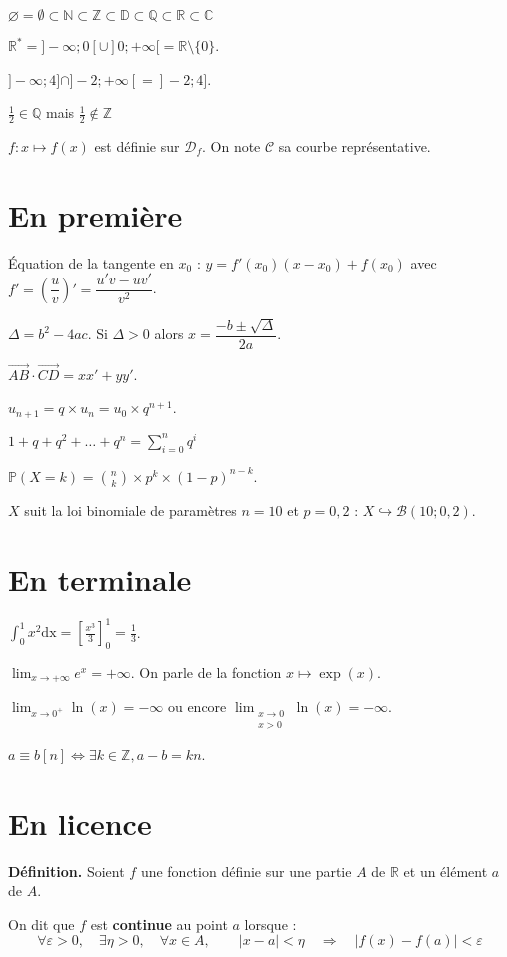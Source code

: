 \documentclass[10pt,french]{article}
\begin{document}
$\varnothing = \emptyset \subset \mathds N \subset \mathds Z \subset
\mathds D \subset \mathds Q\subset \mathds R \subset \mathds C$ \medskip

$\mathds R^*=]-\infty ; 0[ \cup ]0 ; +\infty[ = \mathds R \setminus \{0\}$.\medskip

$]-\infty ; 4] \cap ]-2 ; +\infty[ = ]-2 ; 4]$.\medskip

$\frac 1 2 \in \mathds Q$ mais $\frac 1 2 \notin \mathds Z$\medskip

$f\colon x \mapsto f(x)$ est définie sur $\mathcal D_f$.
On note $\mathcal C$ sa courbe représentative.

\section{En première}

\'Equation de la tangente en $x_0$ :
$y = f'(x_0) \left(x - x_0\right) + f(x_0)$ avec
$f' = \left(\dfrac u v\right)' = \dfrac{u'v - uv'}{v^2}$.\medskip

$\Delta = b^2 - 4ac$. Si $\Delta > 0$ alors
$x = \dfrac{-b \pm \sqrt \Delta}{2a}$.\medskip

$\overrightarrow{AB} \cdot \overrightarrow{CD} = xx' + yy'$.\medskip

$u_{n + 1} = q\times u_n = u_0 \times q^{n+1}$.\medskip

$1 + q + q^2 + \dots + q^n = \sum_{i = 0}^n q^i$\medskip

$\mathds P(X = k) = \binom n k \times p^k \times (1-p)^{n-k}$.\medskip

$X$ suit la loi binomiale de paramètres $n=10$ et $p=0,2$ :
$X \hookrightarrow \mathcal B(10 ; 0,2)$.

\section{En terminale}

$\int_0^1 x^2 \mathrm{dx} = \left[\frac{x^3}{3}\right]_0^1 = \frac 13$.\medskip

$\lim_{x \to +\infty} e^x= +\infty$. On parle de la fonction $x \mapsto \exp(x)$.\medskip

$\lim_{x \to 0^+}\ln(x) = -\infty$ ou encore $\lim_{\substack{x \to 0 \\ x > 0}}\ln(x) = -\infty$.\medskip

$a \equiv b [n] \Leftrightarrow \exists k \in \mathds Z, a - b = kn$.

\section{En licence}
\textbf{Définition.} Soient $f$ une fonction définie sur une partie $A$ de $\mathds{R}$
et un élément $a$ de $A$.\par
On dit que $f$ est \textbf{continue} au point $a$ lorsque :
\[\forall \varepsilon > 0,\quad
\exists \eta > 0,\quad
\forall x \in A,\qquad
\left\vert x- a \right\vert < \eta \quad \Rightarrow \quad
\left\vert f(x) - f(a) \right\vert < \varepsilon\]
\end{document}
